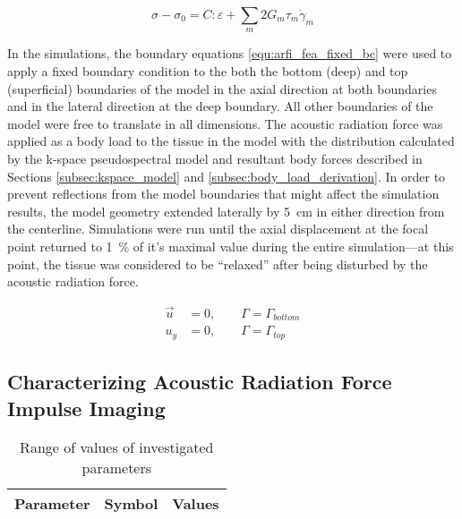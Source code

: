			\begin{equation}
				\label{fea:time_deformation_visco}
				\sigma - \sigma_0 = C : \varepsilon + \sum_m 2 G_m \tau_m \dot{\gamma}_m 
			\end{equation}

			In the simulations, the boundary equations \ref{equ:arfi_fea_fixed_bc} were used to apply a fixed boundary condition to the both the bottom (deep) and top (superficial) boundaries of the model in the axial direction at both boundaries and in the lateral direction at the deep boundary. All other boundaries of the model were free to translate in all dimensions. The acoustic radiation force was applied as a body load to the tissue in the model with the distribution calculated by the k-space pseudospectral model and resultant body forces described in Sections \ref{subsec:kspace_model} and \ref{subsec:body_load_derivation}. In order to prevent reflections from the model boundaries that might affect the simulation results, the model geometry extended laterally by \SI{5}{\cm} in either direction from the centerline. Simulations were run until the axial displacement at the focal point returned to \SI{1}{\percent} of it's maximal value during the entire simulation---at this point, the tissue was considered to be ``relaxed'' after being disturbed by the acoustic radiation force.

			\begin{subequations}
				\label{equ:arfi_fea_fixed_bc}
				\begin{align}
					\vec{u} &= 0, \qquad \Gamma = \Gamma_{bottom} \\
					u_y &= 0, \qquad \Gamma = \Gamma_{top}
				\end{align}
			\end{subequations}

		\subsection{Characterizing Acoustic Radiation Force Impulse Imaging}

			\begin{table}[!t]
				\centering
				\caption[ARFI model investigated parameters]{Range of values of investigated parameters}
				\label{tab:arfi-parametervalues}
				\begin{tabular}{lcc}
					\toprule
					Parameter & Symbol & Values \\
					\midrule
					\bottomrule
				\end{tabular}
			\end{table}

